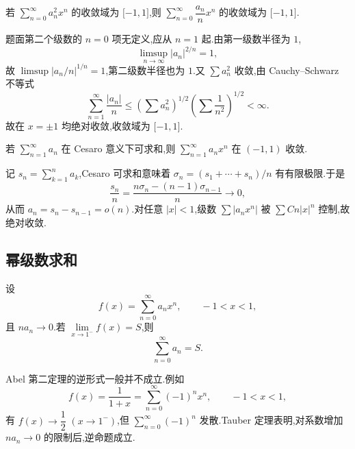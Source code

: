 \begin{example}
    若 $\displaystyle\sum\limits_{n=0}^{\infty}a_n^2x^n$ 的收敛域为 $\lbrack -1,1\rbrack$,则 $\displaystyle\sum\limits_{n=0}^{\infty}\dfrac{a_n}{n}x^n$ 的收敛域为 $\lbrack -1,1\rbrack$.
\end{example}
\exampleblank

\begin{solution}
    题面第二个级数的 $n=0$ 项无定义,应从 $n=1$ 起.由第一级数半径为 $1$,
    \[
        \displaystyle\limsup\limits_{n\to\infty}|a_n|^{2/n}=1,
    \]
    故 $\displaystyle\limsup|a_n/n|^{1/n}=1$,第二级数半径也为 $1$.又 $\displaystyle\sum a_n^2$ 收敛,由 Cauchy--Schwarz 不等式
    \[
        \displaystyle\sum\limits_{n=1}^{\infty}\dfrac{|a_n|}{n}
        \leq\left(\sum a_n^2\right)^{1/2}
        \left(\sum\dfrac{1}{n^2}\right)^{1/2}<\infty.
    \]
    故在 $x=\pm1$ 均绝对收敛,收敛域为 $\lbrack-1,1\rbrack$.
\end{solution}

\begin{example}
    若 $\displaystyle\sum\limits_{n=1}^{\infty}a_n$ 在 Cesaro 意义下可求和,则 $\displaystyle\sum\limits_{n=1}^{\infty}a_nx^n$ 在 $(-1,1)$ 收敛.
\end{example}
\exampleblank

\begin{solution}
    记 $s_n=\displaystyle\sum_{k=1}^na_k$,Cesaro 可求和意味着
    $\sigma_n=(s_1+\cdots+s_n)/n$ 有有限极限.于是
    \[
        \dfrac{s_n}{n}=\dfrac{n\sigma_n-(n-1)\sigma_{n-1}}{n}\longrightarrow0,
    \]
    从而 $a_n=s_n-s_{n-1}=o(n)$.对任意 $|x|<1$,级数
    $\displaystyle\sum |a_nx^n|$ 被 $\displaystyle\sum Cn|x|^n$ 控制,故绝对收敛.
\end{solution}



\subsection{幂级数求和}

\begin{theorem}[Tauber 定理 $*$]
    设
    \[
        f(x)=\sum\limits_{n=0}^{\infty}a_nx^n,
        \qquad -1<x<1,
    \]
    且 $na_n\to0$.若 $\displaystyle\lim\limits_{x\to1^-}f(x)=S$,则
    \[
        \displaystyle\sum\limits_{n=0}^{\infty}a_n=S.
    \]
\end{theorem}

\begin{remark}
    Abel 第二定理的逆形式一般并不成立.例如
    \[
        f(x)=\dfrac{1}{1+x}=\sum\limits_{n=0}^{\infty}(-1)^nx^n,
        \qquad -1<x<1,
    \]
    有 $f(x)\to\dfrac{1}{2}$ $(x\to1^-)$,但 $\displaystyle\sum\limits_{n=0}^{\infty}(-1)^n$ 发散.Tauber 定理表明,对系数增加 $na_n\to0$ 的限制后,逆命题成立.
\end{remark}

